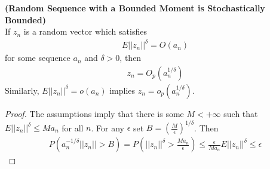 \documentclass[11pt]{article} %
\theoremstyle{definition}
\numberwithin{defn}{subsection}
\numberwithin{thm}{subsection}
\numberwithin{ex}{subsection}
\newcommand{\bb}[1]{\mathbb{#1}}
\newcommand{\N}{\bb{N}}
\newcommand{\ninfty}{n\rightarrow\infty}
\begin{document}

\begin{thm}
	\textbf{(Random Sequence with a Bounded Moment is Stochastically Bounded)}\\
	If $z_n$ is a random vector which satisfies
	\begin{align*}
	E||z_n||^{\delta}=O(a_n)
	\end{align*}
	for some sequence $a_n$ and $\delta>0$, then
	\begin{align*}
	z_n=O_p(a_n^{1/\delta})
	\end{align*}
	Similarly, $E||z_n||^{\delta}=o(a_n)$ implies $z_n=o_p(a_n^{1/\delta}).$
	
	\begin{proof}
		The assumptions imply that there is some $M<+\infty$ such that $E||z_n||^{\delta}\le Ma_n$ for all $n$. For any $\epsilon$ set $B=(\frac{M}{\epsilon})^{1/\delta}$. Then
		\begin{align*}
		P(a_n^{-1/\delta}||z_n||>B)=P(||z_n||^{\delta}>\frac{Ma_n}{\epsilon})\le\frac{\epsilon}{Ma_n}E||z_n||^{\delta}\le\epsilon
		\end{align*}
	\end{proof}
\end{thm}
\end{document}
